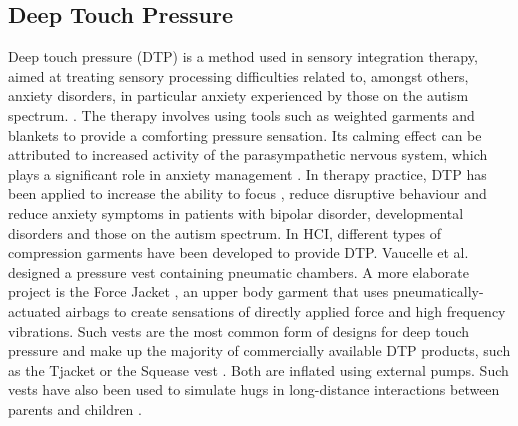 \subsection{Deep Touch Pressure}

Deep touch pressure (DTP) is a method used in sensory integration therapy, aimed at treating sensory processing difficulties related to, amongst others, anxiety disorders, in particular anxiety experienced by those on the autism spectrum. \cite{hsin-yung_chen_physiological_2013, grandin_calming_1992, krauss_effects_1987}. The therapy involves using tools such as weighted garments and blankets to provide a comforting pressure sensation. Its calming effect can be attributed to increased activity of the parasympathetic nervous system, which plays a significant role in anxiety management \cite{hsin-yung_chen_physiological_2013}. In therapy practice, DTP has been applied to increase the ability to focus \cite{fertel-daly_effects_2001}, reduce disruptive behaviour \cite{quigley_effects_2011} and reduce anxiety symptoms \cite{grandin_calming_1992} in patients with bipolar disorder, developmental disorders and those on the autism spectrum. In HCI, different types of compression garments have been developed to provide DTP. Vaucelle et al. \cite{vaucelle_design_2009} designed a pressure vest containing pneumatic chambers. A more elaborate project is the Force Jacket \cite{delazio_force_2018}, an upper body garment that uses pneumatically-actuated airbags to create sensations of directly applied force and high frequency vibrations. Such vests are the most common form of designs for deep touch pressure and make up the majority of commercially available DTP products, such as the Tjacket \cite{noauthor_tjacket_2020} or the Squease vest \cite{noauthor_squease_2020}. Both are inflated using external pumps. Such vests have also been used to simulate hugs in long-distance interactions between parents and children \cite{teh_huggy_2009}. 


